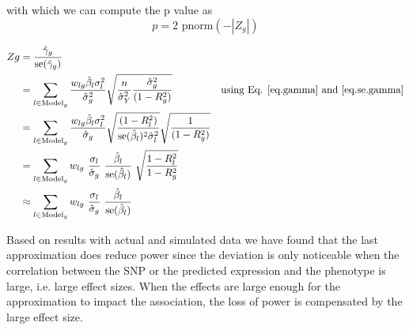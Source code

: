 \documentclass[10pt]{article}
\begin{document}
with which we can compute the  p value as
\begin{equation}
p = 2 \text{ pnorm}(-|Z_g|)
\end{equation}

\begin{align}
Zg 
& = \frac{ \hat\gamma_g}{\text{se}(\hat\gamma_g)} \nonumber 
&\text{}\\
%
& =   \sum_{l\in \text{Model}_g} \frac{w_{lg} \hat\beta_l \sigma^2_l }{ \hat\sigma^2_g}   \sqrt{\frac{n}{\hat\sigma_Y^2 }\frac{\hat\sigma^2_g}{(1-R^2_g)} }  
&\text{using Eq. \ref{eq.gamma} and \ref{eq.se.gamma}} \nonumber \\ 
%
&= \sum_{l\in \text{Model}_g}\frac{  w_{lg} \hat\beta_l \sigma^2_l }{ \hat\sigma_g}  \sqrt{\frac{(1-R^2_l)}{\text{se}(\hat\beta_l)^2 \hat\sigma_l^2}} \sqrt{\frac{1}{(1-R^2_g)} } 
& \text{} \nonumber \\
%
&= \sum_{l\in \text{Model}_g}  w_{lg} ~ \frac{\sigma_l}{\hat\sigma_g} ~ \frac{\hat\beta_l}{\text{se}(\hat\beta_l)} ~ \sqrt{\frac{1-R_l^2}{1-R_g^2}}
& \text{}\\
%
&\approx \sum_{l\in \text{Model}_g}  w_{lg} ~ \frac{\sigma_l}{\hat\sigma_g} ~ \frac{\hat\beta_l}{\text{se}(\hat\beta_l)} 
& \text{}
\end{align}







Based on results with actual and simulated data we have found that the last approximation does reduce power since the deviation is only noticeable when the correlation between the SNP or the predicted expression and the phenotype is large, i.e. large effect sizes. When the effects are large enough for the approximation to impact the association, the loss of power is compensated by the large effect size.
%
%
%
\end{document}
